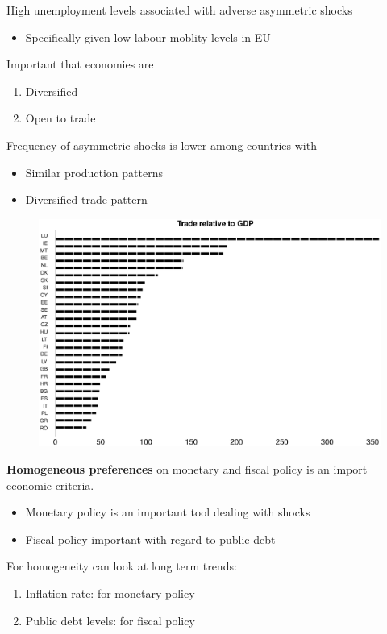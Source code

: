 \documentclass{beamer}
\begin{document}
\begin{frame}
  High unemployment levels associated with adverse asymmetric shocks
  \begin{itemize}
    \item Specifically given low labour moblity levels in EU
  \end{itemize}
  \medskip
  Important that economies are 
  \begin{enumerate}
    \item Diversified
    \item Open to trade
  \end{enumerate}
  \medskip 
  Frequency of asymmetric shocks is lower among countries with
  \begin{itemize}
    \item Similar production patterns
    \item Diversified trade pattern
  \end{itemize}
\end{frame}

\begin{frame}
  \begin{figure}
    \includegraphics[scale=.3]{openness.eps}
  \end{figure}
\end{frame}


\begin{frame}
  \textbf{Homogeneous preferences} on monetary and fiscal policy is an import economic criteria. 
  \begin{itemize}
    \item Monetary policy is an important tool dealing with shocks
    \item Fiscal policy important with regard to public debt
  \end{itemize}
  \medskip
   For homogeneity can look at long term trends:  
  \begin{enumerate}
    \item Inflation rate: for monetary policy
    \item Public debt levels: for fiscal policy
  \end{enumerate}
\end{frame}
\end{document}
